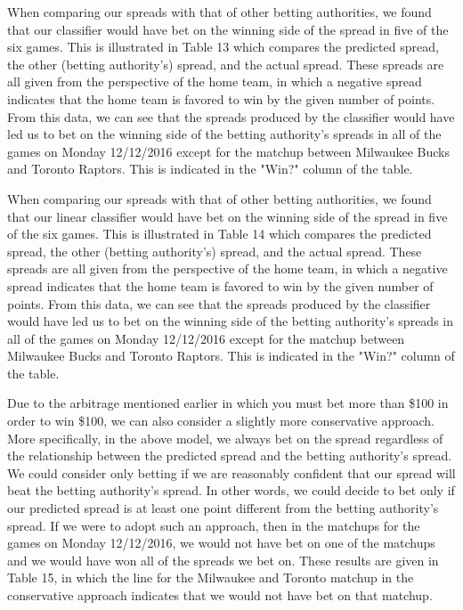 \documentclass{article}
\begin{document}
When comparing our spreads with that of other betting authorities, we found that our classifier would have bet on the winning side of the spread in five of the six games. This is illustrated in Table 13 which compares the predicted spread, the other (betting authority's) spread, and the actual spread. These spreads are all given from the perspective of the home team, in which a negative spread indicates that the home team is favored to win by the given number of points. From this data, we can see that the spreads produced by the classifier would have led us to bet on the winning side of the betting authority's spreads in all of the games on Monday 12/12/2016 except for the matchup between Milwaukee Bucks and Toronto Raptors. This is indicated in the "Win?" column of the table.

When comparing our spreads with that of other betting authorities, we found that our linear classifier would have bet on the winning side of the spread in five of the six games. This is illustrated in Table 14 which compares the predicted spread, the other (betting authority's) spread, and the actual spread. These spreads are all given from the perspective of the home team, in which a negative spread indicates that the home team is favored to win by the given number of points. From this data, we can see that the spreads produced by the classifier would have led us to bet on the winning side of the betting authority's spreads in all of the games on Monday 12/12/2016 except for the matchup between Milwaukee Bucks and Toronto Raptors. This is indicated in the "Win?" column of the table.

Due to the arbitrage mentioned earlier in which you must bet more than \$100 in order to win \$100, we can also consider a slightly more conservative approach. More specifically, in the above model, we always bet on the spread regardless of the relationship between the predicted spread and the betting authority's spread. We could consider only betting if we are reasonably confident that our spread will beat the betting authority's spread. In other words, we could decide to bet only if our predicted spread is at least one point different from the betting authority's spread. If we were to adopt such an approach, then in the matchups for the games on Monday 12/12/2016, we would not have bet on one of the matchups and we would have won all of the spreads we bet on. These results are given in Table 15, in which the line for the Milwaukee and Toronto matchup in the conservative approach indicates that we would not have bet on that matchup.
\end{document}
